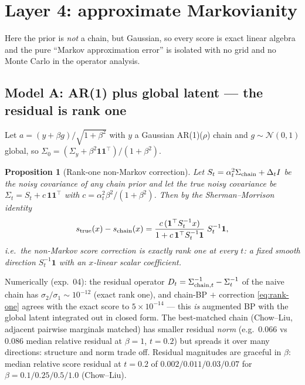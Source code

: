 \documentclass[11pt]{article}
\newtheorem{proposition}{Proposition}
\newcommand{\Normal}{\mathcal{N}}
\begin{document}
\section{Layer 4: approximate Markovianity}

Here the prior is \emph{not} a chain, but Gaussian, so every score is exact linear
algebra and the pure ``Markov approximation error'' is isolated with no grid and no
Monte Carlo in the operator analysis.

\subsection{Model A: AR(1) plus global latent --- the residual is rank one}

Let $a=(y+\beta g)/\sqrt{1+\beta^2}$ with $y$ a Gaussian AR(1)($\rho$) chain and
$g\sim\Normal(0,1)$ global, so
$\Sigma_0 = (\Sigma_y + \beta^2\mathbf1\mathbf1^\top)/(1+\beta^2)$.

\begin{proposition}[Rank-one non-Markov correction]\label{prop:woodbury}
Let $S_t=\alpha_t^2\Sigma_{\rm chain}+\Delta_t I$ be the noisy covariance of any chain
prior and let the true noisy covariance be $\Sigma_t = S_t + c\,\mathbf1\mathbf1^\top$
with $c=\alpha_t^2\beta^2/(1+\beta^2)$. Then by the Sherman--Morrison identity
\begin{equation}
  s_{\rm true}(x) - s_{\rm chain}(x)
  = \frac{c\,(\mathbf1^\top S_t^{-1}x)}{1 + c\,\mathbf1^\top S_t^{-1}\mathbf1}\;
    S_t^{-1}\mathbf1 ,
  \label{eq:rank-one}
\end{equation}
i.e.\ the non-Markov score correction is exactly rank one at every $t$: a fixed smooth
direction $S_t^{-1}\mathbf1$ with an $x$-linear scalar coefficient.
\end{proposition}

Numerically (exp.\ 04): the residual operator
$D_t=\Sigma_{{\rm chain},t}^{-1}-\Sigma_t^{-1}$ of the naive chain has
$\sigma_2/\sigma_1\sim10^{-12}$ (exact rank one), and chain-BP $+$ correction
\eqref{eq:rank-one} agrees with the exact score to $5\times10^{-14}$ --- this
\emph{is} augmented BP with the global latent integrated out in closed form. The
best-matched chain (Chow--Liu, adjacent pairwise marginals matched) has smaller
residual \emph{norm} (e.g.\ $0.066$ vs $0.086$ median relative residual at $\beta=1$,
$t=0.2$) but spreads it over many directions: structure and norm trade off. Residual
magnitudes are graceful in $\beta$: median relative score residual at $t=0.2$ of
$0.002/0.011/0.03/0.07$ for $\beta=0.1/0.25/0.5/1.0$ (Chow--Liu).
\end{document}
